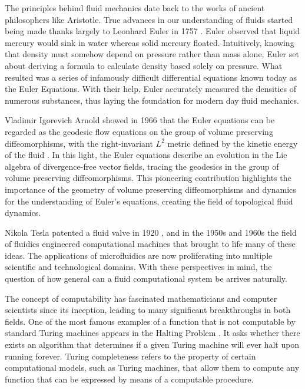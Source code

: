 \documentclass{amsart}
\begin{document}
The principles behind fluid mechanics date back to the works of ancient philosophers like Aristotle. True advances in our understanding of fluids started being made thanks largely to Leonhard Euler in 1757 \cite{Euler}.
Euler observed that liquid mercury would sink in water whereas solid mercury floated. 
Intuitively, knowing that density must somehow depend on pressure rather than mass alone, Euler set about deriving a formula to calculate density based solely on pressure. 
What resulted was a series of infamously difficult differential equations known today as the Euler Equations.
 With their help, Euler accurately measured the densities of numerous substances, thus laying the foundation for modern day fluid mechanics.
 
Vladimir Igorevich Arnold showed in 1966 that the Euler equations can be regarded as the geodesic flow equations on the group of volume preserving diffeomorphisms, with the right-invariant $L^{2}$ metric defined
by the kinetic energy of the fluid \cite{Arnold66}. 
In this light, the Euler equations describe an evolution in the Lie algebra of divergence-free vector fields, tracing the geodesics in the group of volume preserving diffeomorphisms.
This pioneering contribution highlights the importance of the geometry of volume preserving diffeomorphisms and dynamics for the understanding of Euler's equations, creating the field of topological fluid dynamics.

Nikola Tesla patented a fluid valve in 1920 \cite{Tesla}, and in the 1950s and 1960s the field of fluidics engineered computational machines that brought to life many  of these ideas. 
The applications of microfluidics are now proliferating into multiple scientific and technological domains.
 With these perspectives in mind, the question of how general can a fluid computational system be arrives naturally.
%

The concept of computability has fascinated mathematicians and computer scientists since its inception, leading to many significant breakthroughs in both fields. 
One of the most famous examples of a function that is not computable by standard Turing machines appears in the Halting Problem \cite{Turing36}. 
It asks whether there exists an algorithm that determines if a given Turing machine will ever halt upon running forever. 
%
Turing completeness refers to the property of certain computational models, such as Turing machines, that allow them to compute any function that can be expressed by means of a computable procedure. 
%
\end{document}
